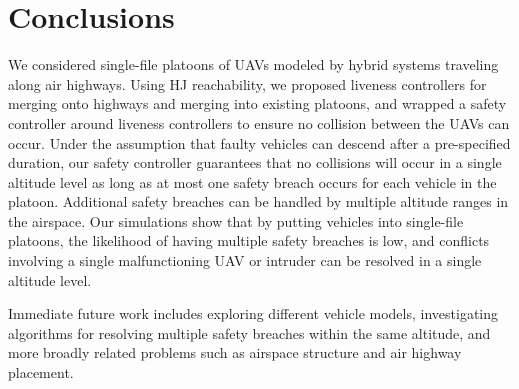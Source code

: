 \section{Conclusions}
We considered single-file platoons of UAVs modeled by hybrid systems traveling along air highways. Using HJ reachability, we proposed liveness controllers for merging onto highways and merging into existing platoons, and wrapped a safety controller around liveness controllers to ensure no collision between the UAVs can occur. Under the assumption that faulty vehicles can descend after a pre-specified duration, our safety controller guarantees that no collisions will occur in a single altitude level as long as at most one safety breach occurs for each vehicle in the platoon. Additional safety breaches can be handled by multiple altitude ranges in the airspace. Our simulations show that by putting vehicles into single-file platoons, the likelihood of having multiple safety breaches is low, and conflicts involving a single malfunctioning UAV or intruder can be resolved in a single altitude level.

Immediate future work includes exploring different vehicle models, investigating algorithms for resolving multiple safety breaches within the same altitude, and more broadly related problems such as airspace structure and air highway placement.
